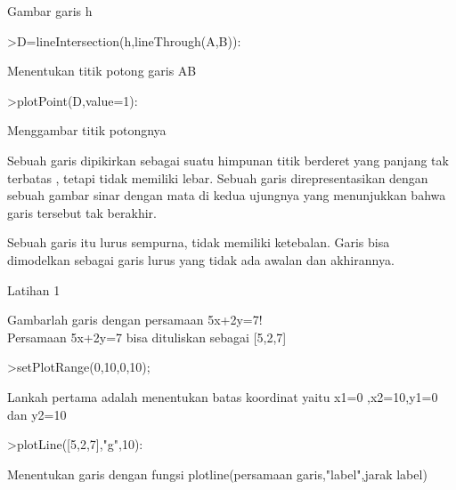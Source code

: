 \documentclass[a4paper,10pt]{article}
\begin{document}
\begin{eulernotebook}
\begin{eulercomment}
\begin{eulercomment}
\begin{eulercomment}
Gambar garis h
\end{eulercomment}
\begin{eulerprompt}
>D=lineIntersection(h,lineThrough(A,B)):
\end{eulerprompt}
\begin{eulercomment}
Menentukan titik potong garis AB 
\end{eulercomment}
\begin{eulerprompt}
>plotPoint(D,value=1):
\end{eulerprompt}
\begin{eulercomment}
Menggambar titik potongnya

\end{eulercomment}
\begin{eulercomment}
Sebuah garis dipikirkan sebagai suatu himpunan titik berderet yang
panjang tak terbatas , tetapi tidak memiliki lebar. Sebuah garis
direpresentasikan dengan sebuah gambar sinar dengan mata di kedua
ujungnya yang menunjukkan bahwa garis tersebut tak berakhir.

Sebuah garis itu lurus sempurna, tidak memiliki ketebalan. Garis bisa
dimodelkan sebagai garis lurus yang tidak ada awalan dan akhirannya.

Latihan 1\\
\end{eulercomment}
\eulersubheading{}
\begin{eulercomment}
Gambarlah garis dengan persamaan 5x+2y=7!\\
Persamaan 5x+2y=7 bisa dituliskan sebagai [5,2,7]
\end{eulercomment}
\begin{eulerprompt}
>setPlotRange(0,10,0,10);
\end{eulerprompt}
\begin{eulercomment}
Lankah pertama adalah menentukan batas koordinat yaitu x1=0
,x2=10,y1=0 dan y2=10
\end{eulercomment}
\begin{eulerprompt}
>plotLine([5,2,7],"g",10):
\end{eulerprompt}
\begin{eulercomment}
Menentukan garis dengan fungsi plotline(persamaan garis,"label",jarak
label)


\end{eulercomment}
\end{eulercomment}
\end{eulercomment}
\end{eulernotebook}
\end{document}
